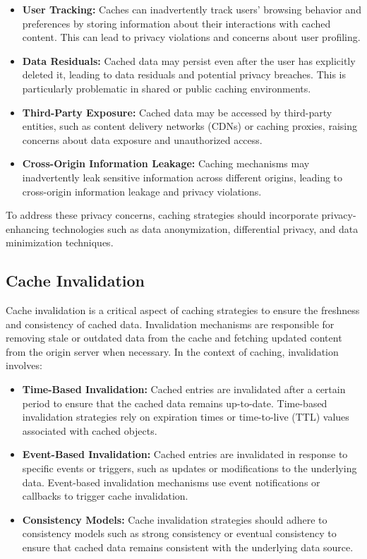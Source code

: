 \documentclass[12pt]{book} %
\begin{document}
\begin{itemize}
    \item \textbf{User Tracking:} Caches can inadvertently track users' browsing behavior and preferences by storing information about their interactions with cached content. This can lead to privacy violations and concerns about user profiling.
    
    \item \textbf{Data Residuals:} Cached data may persist even after the user has explicitly deleted it, leading to data residuals and potential privacy breaches. This is particularly problematic in shared or public caching environments.
    
    \item \textbf{Third-Party Exposure:} Cached data may be accessed by third-party entities, such as content delivery networks (CDNs) or caching proxies, raising concerns about data exposure and unauthorized access.
    
    \item \textbf{Cross-Origin Information Leakage:} Caching mechanisms may inadvertently leak sensitive information across different origins, leading to cross-origin information leakage and privacy violations.
\end{itemize}

To address these privacy concerns, caching strategies should incorporate privacy-enhancing technologies such as data anonymization, differential privacy, and data minimization techniques.

\subsection{Cache Invalidation}
Cache invalidation is a critical aspect of caching strategies to ensure the freshness and consistency of cached data. Invalidation mechanisms are responsible for removing stale or outdated data from the cache and fetching updated content from the origin server when necessary. In the context of caching, invalidation involves:

\begin{itemize}
    \item \textbf{Time-Based Invalidation:} Cached entries are invalidated after a certain period to ensure that the cached data remains up-to-date. Time-based invalidation strategies rely on expiration times or time-to-live (TTL) values associated with cached objects.
    
    \item \textbf{Event-Based Invalidation:} Cached entries are invalidated in response to specific events or triggers, such as updates or modifications to the underlying data. Event-based invalidation mechanisms use event notifications or callbacks to trigger cache invalidation.
    
    \item \textbf{Consistency Models:} Cache invalidation strategies should adhere to consistency models such as strong consistency or eventual consistency to ensure that cached data remains consistent with the underlying data source.
\end{itemize}
\end{document}
